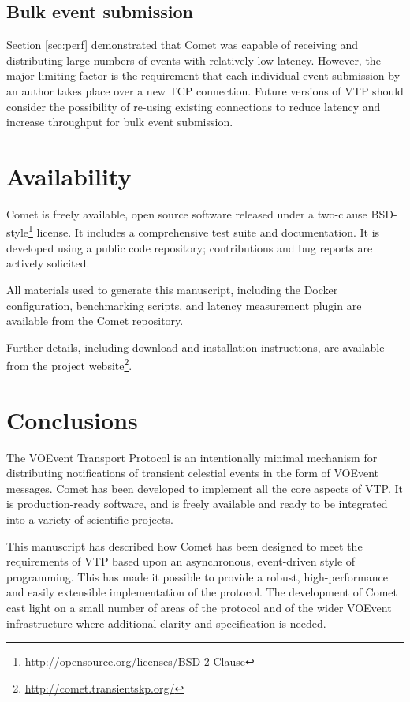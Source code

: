 \documentclass[5p,authoryear]{elsarticle}
\begin{document}
\subsection{Bulk event submission}
\label{sec:future:bulk}

Section \ref{sec:perf} demonstrated that Comet was capable of receiving and
distributing large numbers of events with relatively low latency. However, the
major limiting factor is the requirement that each individual event submission
by an author takes place over a new TCP connection. Future versions of VTP
should consider the possibility of re-using existing connections to reduce
latency and increase throughput for bulk event submission.

\section{Availability}
\label{sec:avail}

Comet is freely available, open source software released under a two-clause
BSD-style\footnote{\url{http://opensource.org/licenses/BSD-2-Clause}} license.
It includes a comprehensive test suite and documentation. It is developed
using a public code repository; contributions and bug reports are actively
solicited.

All materials used to generate this manuscript, including the Docker
configuration, benchmarking scripts, and latency measurement plugin are
available from the Comet repository.

Further details, including download and installation instructions, are
available from the project
website\footnote{\url{http://comet.transientskp.org/}}.

\section{Conclusions}
\label{sec:conclusions}

The VOEvent Transport Protocol is an intentionally minimal mechanism for
distributing notifications of transient celestial events in the form of
VOEvent messages. Comet has been developed to implement all the core aspects
of VTP. It is production-ready software, and is freely available and ready to
be integrated into a variety of scientific projects.

This manuscript has described how Comet has been designed to meet the
requirements of VTP based upon an asynchronous, event-driven style of
programming. This has made it possible to provide a robust, high-performance
and easily extensible implementation of the protocol. The development of Comet
cast light on a small number of areas of the protocol and of the wider VOEvent
infrastructure where additional clarity and specification is needed.
\end{document}
